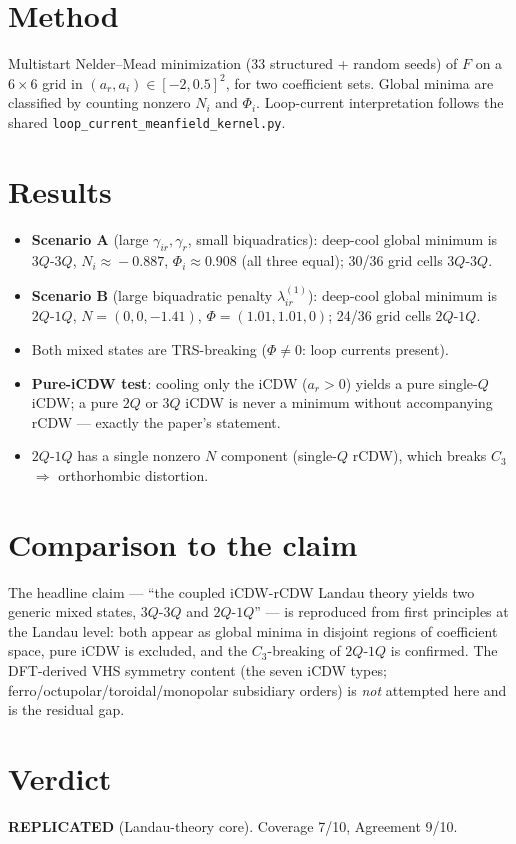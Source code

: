 \documentclass[11pt]{article}
\begin{document}
\section{Method}
Multistart Nelder--Mead minimization (33 structured + random seeds) of $F$ on a
$6\times6$ grid in $(a_r,a_i)\in[-2,0.5]^2$, for two coefficient sets. Global
minima are classified by counting nonzero $N_i$ and $\Phi_i$. Loop-current
interpretation follows the shared \texttt{loop\_current\_meanfield\_kernel.py}.

\section{Results}
\begin{itemize}
\item \textbf{Scenario A} (large $\gamma_{ir},\gamma_r$, small biquadratics):
deep-cool global minimum is $3Q\text{-}3Q$, $N_i\!\approx\!-0.887$,
$\Phi_i\!\approx\!0.908$ (all three equal); 30/36 grid cells $3Q\text{-}3Q$.
\item \textbf{Scenario B} (large biquadratic penalty $\lambda_{ir}^{(1)}$):
deep-cool global minimum is $2Q\text{-}1Q$, $N=(0,0,-1.41)$,
$\Phi=(1.01,1.01,0)$; 24/36 grid cells $2Q\text{-}1Q$.
\item Both mixed states are TRS-breaking ($\Phi\neq0$: loop currents present).
\item \textbf{Pure-iCDW test}: cooling only the iCDW ($a_r>0$) yields a
pure single-$Q$ iCDW; a pure $2Q$ or $3Q$ iCDW is never a minimum without
accompanying rCDW --- exactly the paper's statement.
\item $2Q\text{-}1Q$ has a single nonzero $N$ component (single-$Q$ rCDW),
which breaks $C_3$ $\Rightarrow$ orthorhombic distortion.
\end{itemize}

\section{Comparison to the claim}
The headline claim --- ``the coupled iCDW-rCDW Landau theory yields two generic
mixed states, $3Q\text{-}3Q$ and $2Q\text{-}1Q$'' --- is reproduced from first
principles at the Landau level: both appear as global minima in disjoint
regions of coefficient space, pure iCDW is excluded, and the $C_3$-breaking of
$2Q\text{-}1Q$ is confirmed. The DFT-derived VHS symmetry content (the seven
iCDW types; ferro/octupolar/toroidal/monopolar subsidiary orders) is
\emph{not} attempted here and is the residual gap.

\section{Verdict}
\textbf{REPLICATED} (Landau-theory core). Coverage 7/10, Agreement 9/10.
\end{document}
